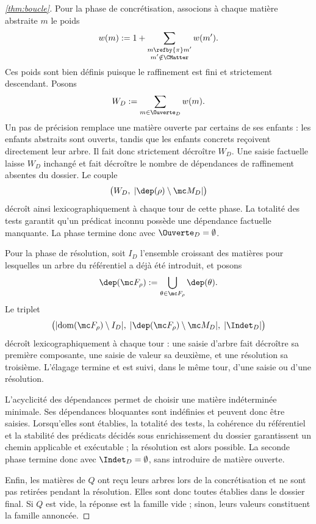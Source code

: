 \begin{proof}[\autoref{thm:boucle}]
Pour la phase de concrétisation, associons à chaque matière
abstraite $m$ le poids
\[
w(m)
:=
1+\sum_{\substack{m\refby{\pi}m'\\m'\notin\CMatter}}w(m').
\]
Ces poids sont bien définis puisque le raffinement est fini
et strictement descendant. Posons
\[
W_D:=\sum_{m\in\Ouverte_D}w(m).
\]
Un pas de précision remplace une matière ouverte par certains
de ses enfants : les enfants abstraits sont ouverts, tandis
que les enfants concrets reçoivent directement leur arbre.
Il fait donc strictement décroître $W_D$.
Une saisie factuelle laisse $W_D$ inchangé et fait décroître
le nombre de dépendances de raffinement absentes du dossier.
Le couple
\[
\bigl(W_D,\;|\dep(\rho)\setminus\mc M_D|\bigr)
\]
décroît ainsi lexicographiquement à chaque tour de cette phase.
La totalité des tests garantit qu'un prédicat inconnu possède
une dépendance factuelle manquante. La phase termine donc
avec $\Ouverte_D=\emptyset$.

Pour la phase de résolution, soit $I_D$ l'ensemble croissant
des matières pour lesquelles un arbre du référentiel a déjà
été introduit, et posons
\[
\dep(\mc F_\rho)
:=
\bigcup_{\theta\in\mc F_\rho}\dep(\theta).
\]
Le triplet
\[
\bigl(
|\mathrm{dom}(\mc F_\rho)\setminus I_D|,
\;|\dep(\mc F_\rho)\setminus\mc M_D|,
\;|\Indet_D|
\bigr)
\]
décroît lexicographiquement à chaque tour :
une saisie d'arbre fait décroître sa première composante,
une saisie de valeur sa deuxième, et une résolution sa troisième.
L'élagage termine et est suivi, dans le même tour, d'une saisie
ou d'une résolution.

L'acyclicité des dépendances permet de choisir une matière
indéterminée minimale. Ses dépendances bloquantes sont
indéfinies et peuvent donc être saisies. Lorsqu'elles sont
établies, la totalité des tests, la cohérence du référentiel
et la stabilité des prédicats décidés sous enrichissement
du dossier garantissent un chemin applicable et exécutable ;
la résolution est alors possible. La seconde phase termine donc avec $\Indet_D=\emptyset$,
sans introduire de matière ouverte.

Enfin, les matières de $Q$ ont reçu leurs arbres lors de la
concrétisation et ne sont pas retirées pendant la résolution.
Elles sont donc toutes établies dans le dossier final.
Si $Q$ est vide, la réponse est la famille vide ; sinon,
leurs valeurs constituent la famille annoncée.
\end{proof}
